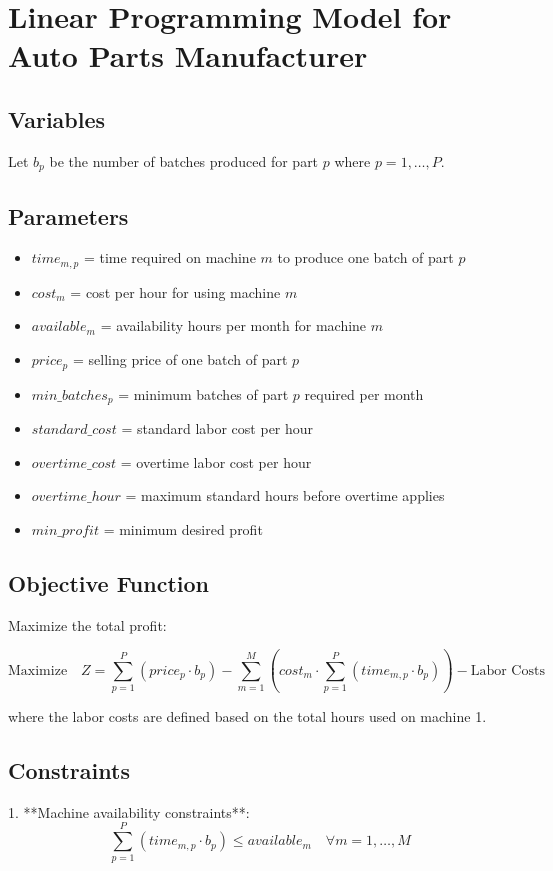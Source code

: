 \documentclass{article}
\begin{document}
\section*{Linear Programming Model for Auto Parts Manufacturer}

\subsection*{Variables}
Let \( b_p \) be the number of batches produced for part \( p \) where \( p = 1, \ldots, P \).

\subsection*{Parameters}
\begin{itemize}
    \item \( time_{m,p} \) = time required on machine \( m \) to produce one batch of part \( p \)
    \item \( cost_m \) = cost per hour for using machine \( m \)
    \item \( available_m \) = availability hours per month for machine \( m \)
    \item \( price_p \) = selling price of one batch of part \( p \)
    \item \( min\_batches_p \) = minimum batches of part \( p \) required per month
    \item \( standard\_cost \) = standard labor cost per hour
    \item \( overtime\_cost \) = overtime labor cost per hour
    \item \( overtime\_hour \) = maximum standard hours before overtime applies
    \item \( min\_profit \) = minimum desired profit
\end{itemize}

\subsection*{Objective Function}
Maximize the total profit:

\[
\text{Maximize} \quad Z = \sum_{p=1}^{P} (price_p \cdot b_p) - \sum_{m=1}^{M} \left( cost_m \cdot \sum_{p=1}^{P} (time_{m,p} \cdot b_p) \right) - \text{Labor Costs}
\]

where the labor costs are defined based on the total hours used on machine 1.

\subsection*{Constraints}
1. **Machine availability constraints**:
\[
\sum_{p=1}^{P} (time_{m,p} \cdot b_p) \leq available_m \quad \forall m = 1, \ldots, M
\]
\end{document}
